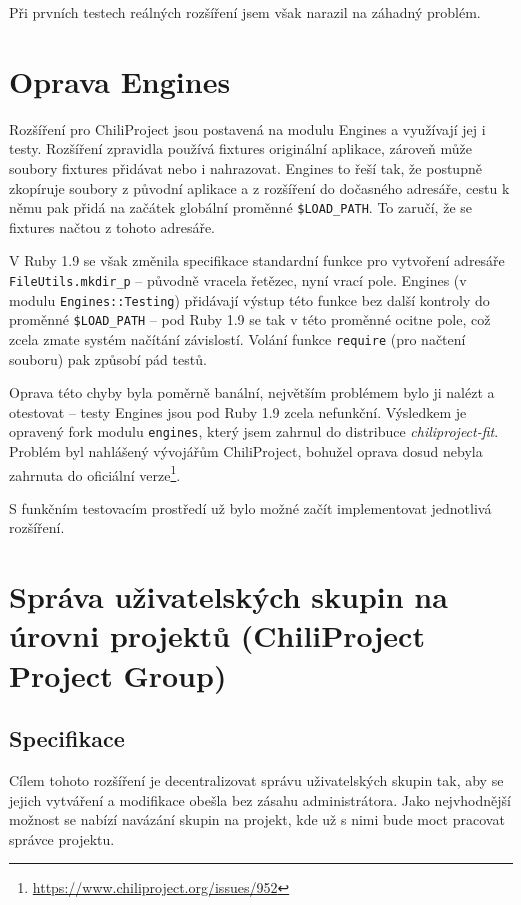 \documentclass[thesis=B,czech]{FITthesis}[2012/05/02]
\begin{document}
Při prvních testech reálných rozšíření jsem však narazil na záhadný
problém.

\section{Oprava Engines}
\label{sec:oprava-engines}

Rozšíření pro ChiliProject jsou postavená na modulu Engines a
využívají jej i testy. Rozšíření zpravidla používá
\gls{fixtures} originální aplikace, zároveň může soubory fixtures
přidávat nebo i nahrazovat. Engines to řeší tak, že postupně zkopíruje
soubory z původní aplikace a z rozšíření do dočasného adresáře, cestu
k němu pak přidá na začátek globální proměnné
\lstinline!$LOAD_PATH!. To zaručí, že se fixtures načtou z tohoto
adresáře.

V Ruby 1.9 se však změnila specifikace standardní funkce pro vytvoření
adresáře \lstinline!FileUtils.mkdir_p! -- původně vracela řetězec, nyní
vrací pole. Engines (v modulu \lstinline!Engines::Testing!) přidávají
výstup této funkce bez další kontroly do proměnné \lstinline!$LOAD_PATH!
-- pod Ruby 1.9 se tak v této proměnné ocitne pole, což zcela zmate
systém načítání závislostí. Volání funkce \lstinline!require! (pro
načtení souboru) pak způsobí pád testů.

Oprava této chyby byla poměrně banální, největším problémem bylo ji
nalézt a otestovat -- testy Engines jsou pod Ruby 1.9 zcela nefunkční.
Výsledkem je opravený \gls{fork} modulu \lstinline!engines!, který jsem
zahrnul do distribuce \emph{chiliproject-fit}. Problém byl
nahlášený vývojářům ChiliProject, bohužel oprava dosud nebyla zahrnuta
do oficiální verze\footnote{\url{https://www.chiliproject.org/issues/952}}.

S funkčním testovacím prostředí už bylo možné začít implementovat
jednotlivá rozšíření.

\section[Správa uživatelských skupin na úrovni projektů]{Správa uživatelských skupin na úrovni projektů (ChiliProject
Project Group)}
\label{sec:project_group}

\subsection{Specifikace}

Cílem tohoto rozšíření je decentralizovat správu uživatelských skupin
tak, aby se jejich vytváření a modifikace obešla bez zásahu
administrátora. Jako nejvhodnější možnost se nabízí navázání skupin na
projekt, kde už s nimi bude moct pracovat správce projektu.
\end{document}
